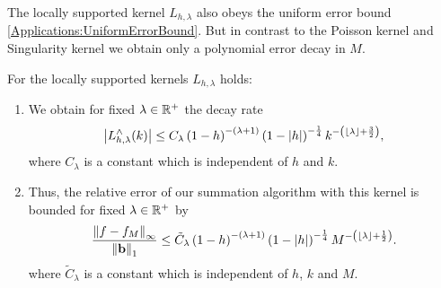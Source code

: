 The locally supported kernel $L_{h,\lambda}$ also obeys the uniform error bound
\eqref{Applications:UniformErrorBound}. But in contrast to the Poisson kernel 
and Singularity kernel we obtain only a polynomial error decay in $M$.
\begin{lemma}
  For the locally supported kernels $L_{h,\lambda}$ holds:
  \begin{enumerate}
  \item We obtain for fixed $\lambda \in \mathbb{R}^{+}$ the decay rate
    \[
    \left|L_{h,\lambda}^{\wedge}{\hspace{-0.4ex}}\left(k\right)\right| \le C_{\lambda}
    \left(1-h\right)^{-(\lambda+1)}\left(1-|h|\right)^{-\frac{1}{4}} 
    k^{-\left(\left\lfloor\lambda\right\rfloor+\frac{3}{2}\right)}, 
    \]
where $C_{\lambda}$ is a constant which is independent of $h$ and $k$.
  \item Thus, the relative error of our summation algorithm with this kernel
  is bounded for fixed $\lambda \in \mathbb{R}^{+}$ by
  \begin{equation}
    \label{error:Lh}
    \frac{\left\|f - f_{M}\right\|_{\infty}}{\left\|\mathbf{b}\right\|_1} \le
    \tilde C_{\lambda} \left(1-h\right)^{-(\lambda+1)}\left(1-|h|\right)^{-\frac{1}{4}} 
    M^{-\left(\left\lfloor\lambda\right\rfloor+\frac{1}{2}\right)}.
  \end{equation}
where $\tilde C_{\lambda}$ is a constant which is independent of $h$,
$k$ and $M$.
  \end{enumerate}
\end{lemma}

